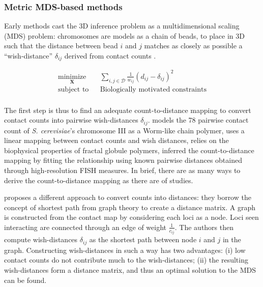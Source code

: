 \documentclass[letterpaper,12pt]{article}
\newcommand{\Xb}{\textbf{X}}
\begin{document}
\subsubsection*{Metric MDS-based methods}

Early methods cast the 3D inference problem as a
multidimensional scaling (MDS) problem: chromosomes are models as a chain of
beads, to place in 3D such that the distance between bead $i$ and $j$ matches
as closely as possible a ``wish-distance'' $\delta_{ij}$ derived from contact
counts \citep{dekker:capturing, duan:three-dimensional,
tanizawa:mapping, ay:three-dimensional} .

\begin{equation*}
\renewcommand{\arraystretch}{2}
\begin{array}{ccl}
\underset{\Xb}{\text{minimize}} & & \underset{i, j \in \mathcal{D}}{\sum}
\frac{1}{w_{ij}} (d_{ij} - \delta_{ij})^2 \\
\text{subject to} & & \text{Biologically motivated constraints} \\
\end{array}
\end{equation*}


The first step is thus to find an adequate count-to-distance mapping to
convert contact counts into pairwise wish-distances $\delta_{ij}$. 
\citet{dekker:capturing} models the 78 pairwise contact count of {\em S.
cerevisiae}'s chromosome III as a Worm-like chain polymer,
\citet{duan:three-dimensional} uses a linear mapping between contact counts
and wish distances, \citet{ay:three-dimensional} relies on the biophysical
properties of fractal globule polymers, \citet{tanizawa:mapping} inferred the
count-to-distance mapping by fitting the relationship using known pairwise
distances obtained through high-resolution FISH measures. In brief, there are
as many ways to derive the count-to-distance mapping as there are of studies.

\citet{lesne:3d} proposes a different approach to convert counts into
distances: they borrow the concept of shortest path from graph theory to
create a distance matrix. A graph is constructed from the contact map by
considering each loci as a node. Loci seen interacting are connected through
an edge of weight $\frac{1}{c_{ij}}$. The authors then compute wish-distances
$\delta_{ij}$ as the shortest path between node $i$ and $j$ in the graph.
Constructing wish-distances in such a way has two advantages: (i) low contact
counts do not contribute much to the wish-distances; (ii) the resulting
wish-distances form a distance matrix, and thus an optimal solution to the MDS
can be found.
\end{document}
